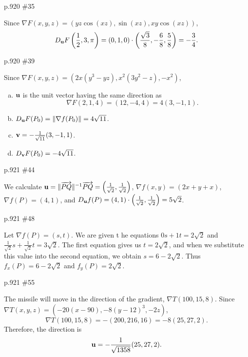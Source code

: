 \begin{practice}p.920 \#35\end{practice}
\begin{pracsol}
  Since $\nabla F(x,y,z)=(yz\cos(xz),\sin(xz),xy\cos(xz))$,
  \[D_\mathbf u F\left(\frac12,3,\pi\right)=(0,1,0)\cdot\left(\frac{\sqrt3}{8},-\frac68,\frac58\right)=-\frac34.\]
\end{pracsol}
\begin{practice}p.920 \#39\end{practice}
\begin{pracsol}
  Since $\nabla F(x,y,z)=(2x(y^3-yz),x^2(3y^2-z),-x^2)$,
  \begin{enumerate}[(a)]
    \item $\mathbf u$ is the unit vector having the same direction as
    \[\nabla F(2,1,4)=(12,-4,4)=4(3,-1,1).\]
    \item $D_\mathbf u F(P_0)=\|\nabla f(P_0)\|=4\sqrt{11}$.
    \item $\mathbf v=-\frac1{\sqrt{11}}(3,-1,1)$.
    \item $D_\mathbf v F(P_0)=-4\sqrt{11}$.
  \end{enumerate}
\end{pracsol}
\begin{practice}p.921 \#44\end{practice}
\begin{pracsol}
  We calculate $\mathbf u=\|\overrightarrow{PQ}\|^{-1}\overrightarrow{PQ}=\left(\frac1{\sqrt2},\frac1{\sqrt2}\right)$, $\nabla f(x,y)=(2x+y+x)$, $\nabla f(P)=(4,1)$, and $D_\mathbf u f(P)=(4,1)\cdot\left(\frac1{\sqrt2},\frac1{\sqrt2}\right)=5\sqrt2$.
\end{pracsol}
\begin{practice}p.921 \#48\end{practice}
\begin{pracsol}
  Let $\nabla f(P)=(s,t)$. We are given t he equations $0s+1t=2\sqrt2$ and $\frac1{\sqrt2}s+\frac1{\sqrt2}t=3\sqrt2$. The first equation gives us $t=2\sqrt2$, and when we substitute this value into the second equation, we obtain $s=6-2\sqrt2$. Thus $f_x(P)=6-2\sqrt2$ and $f_y(P)=2\sqrt2$.
\end{pracsol}
\begin{practice}p.921 \#55\end{practice}
\begin{pracsol}
  The missile will move in the direction of the gradient, $\nabla T(100,15,8)$. Since $\nabla T(x,y,z)=(-20(x-90),-8(y-12)^3,-2z)$,
  \[\nabla T(100,15,8)=-(200,216,16)=-8(25,27,2).\]
  Therefore, the direction is
  \[\mathbf u=-\frac1{\sqrt{1358}}(25,27,2).\]
\end{pracsol}

